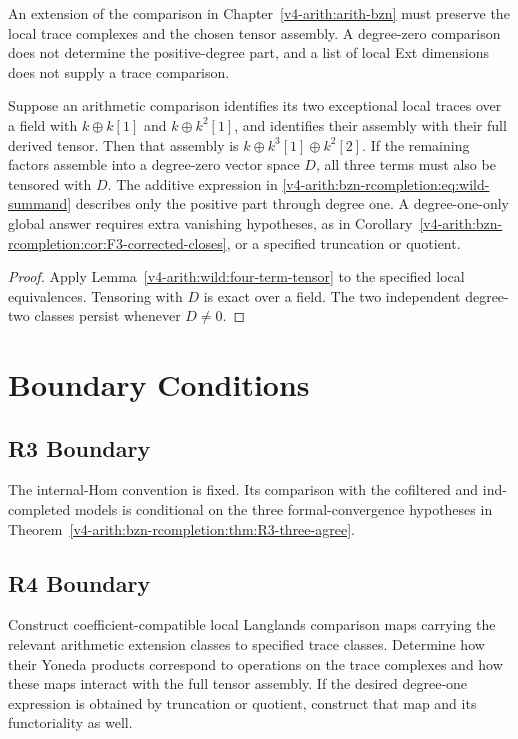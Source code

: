 An extension of the comparison in Chapter~\ref{v4-arith:arith-bzn}
must preserve the local trace complexes and the chosen tensor
assembly. A degree-zero comparison does not determine the
positive-degree part, and a list of local Ext dimensions does not
supply a trace comparison.

\begin{proposition}
\label{v4-arith:bzn-rcompletion:prop:minimal-amendment}
Suppose an arithmetic comparison identifies its two exceptional
local traces over a field with \(k\oplus k[1]\) and
\(k\oplus k^2[1]\), and identifies their assembly with their full
derived tensor. Then that assembly is
\(k\oplus k^3[1]\oplus k^2[2]\).
If the remaining factors assemble into a degree-zero vector space
\(D\), all three terms must also be tensored with \(D\).
The additive expression in
\eqref{v4-arith:bzn-rcompletion:eq:wild-summand} describes only the
positive part through degree one. A degree-one-only global answer
requires extra vanishing hypotheses, as in
Corollary~\ref{v4-arith:bzn-rcompletion:cor:F3-corrected-closes},
or a specified truncation or quotient.
\end{proposition}
\begin{proof}
Apply Lemma~\ref{v4-arith:wild:four-term-tensor} to the specified
local equivalences. Tensoring with \(D\) is exact over a field.
The two independent degree-two classes persist whenever \(D\ne0\).
\end{proof}

\section{Boundary Conditions}
\label{v4-arith:bzn-rcompletion:residuals}

\subsection{R3 Boundary}

The internal-Hom convention is fixed.  Its comparison with the
cofiltered and ind-completed models is conditional on the three
formal-convergence hypotheses in
Theorem~\ref{v4-arith:bzn-rcompletion:thm:R3-three-agree}.

\subsection{R4 Boundary}

\begin{question}
\label{v4-arith:bzn-rcompletion:conj:wild-langlands-functorial}
Construct coefficient-compatible local Langlands comparison maps
carrying the relevant arithmetic extension classes to specified
trace classes. Determine how their Yoneda products correspond to
operations on the trace complexes and how these maps interact with
the full tensor assembly. If the desired degree-one expression is
obtained by truncation or quotient, construct that map and its
functoriality as well.
\end{question}

